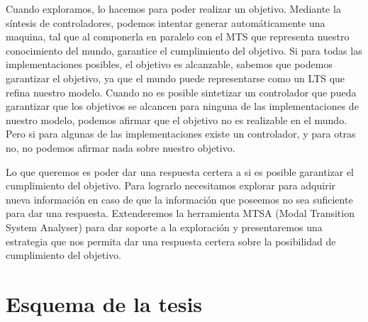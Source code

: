 \vspace{\baselineskip}
Cuando exploramos, lo hacemos para poder realizar un objetivo. Mediante la síntesis de controladores, podemos intentar 
generar automáticamente una maquina, tal que al componerla en paralelo con el MTS que representa nuestro conocimiento 
del mundo, garantice el cumplimiento del objetivo.
Si para todas las implementaciones posibles, el objetivo es alcanzable, sabemos que podemos garantizar el objetivo, ya 
que el mundo puede representarse como un LTS que refina nuestro modelo.
Cuando no es posible sintetizar un controlador que pueda garantizar que los objetivos se alcancen para ninguna de las
implementaciones de nuestro modelo, podemos afirmar que el objetivo no es realizable en el mundo. Pero si para algunas 
de las implementaciones existe un controlador, y para otras no, no podemos afirmar nada sobre nuestro objetivo.

\vspace{\baselineskip}
Lo que queremos es poder dar una respuesta certera a si es posible garantizar el cumplimiento del objetivo.
Para lograrlo necesitamos explorar para adquirir nueva información en caso de que la información que poseemos no sea
suficiente para dar una respuesta. Extenderemos la herramienta MTSA (Modal Transition System Analyser) para dar soporte
a la exploración y presentaremos una estrategia que nos permita dar una respuesta certera sobre la posibilidad de 
cumplimiento del objetivo.

\section{Esquema de la tesis}

